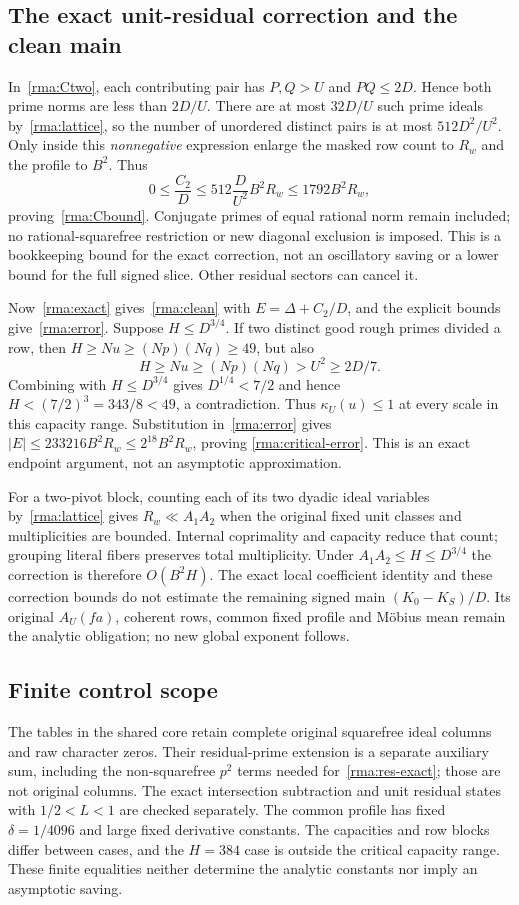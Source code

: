 \subsection{The exact unit-residual correction and the clean main}
In~\eqref{rma:Ctwo}, each contributing pair has $P,Q>U$ and $PQ\le2D$.
Hence both prime norms are less than $2D/U$. There are at most
$32D/U$ such prime ideals by~\eqref{rma:lattice}, so the number of
unordered distinct pairs is at most $512D^2/U^2$. Only inside this
\emph{nonnegative} expression enlarge the masked row count to $R_w$
and the profile to $B^2$. Thus
\[
 0\le\frac{C_2}{D}\le512\frac{D}{U^2}B^2R_w
                         \le1792B^2R_w,
\]
proving~\eqref{rma:Cbound}. Conjugate primes of equal rational norm
remain included; no rational-squarefree restriction or new diagonal
exclusion is imposed. This is a bookkeeping bound for the exact
correction, not an oscillatory saving or a lower bound for the full
signed slice. Other residual sectors can cancel it.

Now~\eqref{rma:exact} gives~\eqref{rma:clean} with
$E=\Delta+C_2/D$, and the explicit bounds give~\eqref{rma:error}.
Suppose $H\le D^{3/4}$. If two distinct good rough primes divided a row,
then $H\ge Nu\ge(Np)(Nq)\ge49$, but also
\[
 H\ge Nu\ge(Np)(Nq)>U^2\ge2D/7.
\]
Combining with $H\le D^{3/4}$ gives $D^{1/4}<7/2$ and hence
$H<(7/2)^3=343/8<49$, a contradiction. Thus $\kappa_U(u)\le1$
at every scale in this capacity range. Substitution in~\eqref{rma:error}
gives $|E|\le233216B^2R_w\le2^{18}B^2R_w$, proving
\eqref{rma:critical-error}. This is an exact endpoint argument, not an
asymptotic approximation.

For a two-pivot block, counting each of its two dyadic ideal variables
by~\eqref{rma:lattice} gives $R_w\ll A_1A_2$ when the original fixed unit
classes and multiplicities are bounded. Internal coprimality and capacity
reduce that count; grouping literal fibers preserves total multiplicity.
Under $A_1A_2\le H\le D^{3/4}$ the correction is therefore $O(B^2H)$.
The exact local coefficient identity and these correction bounds do not
estimate the remaining signed main $(K_0-K_S)/D$. Its original
$A_U(fa)$, coherent rows, common fixed profile and M\"obius mean remain
the analytic obligation; no new global exponent follows.


\subsection{Finite control scope}
The tables in the shared core retain complete original squarefree ideal
columns and raw character zeros. Their residual-prime extension is a
separate auxiliary sum, including the non-squarefree $p^2$ terms needed
for~\eqref{rma:res-exact}; those are not original columns. The exact
intersection subtraction and unit residual states with $1/2<L<1$ are
checked separately. The common profile has fixed $\delta=1/4096$ and
large fixed derivative constants. The capacities and row blocks differ
between cases, and the $H=384$ case is outside the critical capacity
range. These finite equalities neither determine the analytic constants
nor imply an asymptotic saving.


